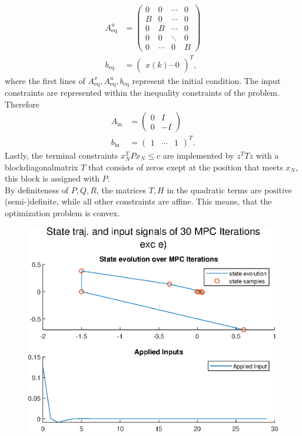 \documentclass[]{article}
\newcommand{\ind}[2]{{#1}_{\mathrm{#2}}}
\newcommand{\trp}{^T}
\newcommand{\xN}{x_N}
\newcommand{\Aeq}{\ind{A}{eq}}
\newcommand{\beq}{\ind{b}{eq}}
\newcommand{\Aeqx}{\Aeq^x}
\newcommand{\Aequ}{\Aeq^u}
\newcommand{\Aineq}{\ind{A}{{  in}}}
\newcommand{\bineq}{\ind{b}{{  in}}}
\begin{document}
\begin{enumerate}
\begin{align}
				\Aequ &= 
					\begin{pmatrix}
					0 & 0 & \cdots & 0\\
						B & 0 & \cdots & 0\\
						0 & B & \cdots & 0\\
						0& 0 & \ddots & 0\\
						0 & \cdots & 0 & B
					\end{pmatrix}\\
				\beq&=	\begin{pmatrix}
						x(k) \cdots 0
					\end{pmatrix}	\trp,	
				\end{align}
				where the first lines of $ \Aeqx,\Aequ,\beq $ represent the initial condition.
				The  input constraints are represented within the inequality constraints of the problem.
				Therefore
				\begin{align}
					\Aineq &= \begin{pmatrix}
						0 & I \\
						0 & -I
					\end{pmatrix}\\
					\bineq &= \begin{pmatrix}
						1 & \cdots & 1
					\end{pmatrix}\trp.
				\end{align}
				Lastly, the terminal constraints $ \xN \trp P\xN \leq c $ are implemented by $ z \trp T z $ with a blockdiagonalmatrix $ T $ that consists of zeros exept at the position that meets $ \xN $, this block is assigned with $ P $.\\
				By definiteness of $ P,Q,R $, the matrices $ T,H $ in the quadratic terms are positive (semi-)definite, while all other constraints are affine. This means, that the optimization problem is convex.
			{\item[e)]
				\begin{figure}[H]
					\centering
					\includegraphics[width=0.9\linewidth]{plots/exc_e}

\end{figure}}
\end{enumerate}
\end{document}
